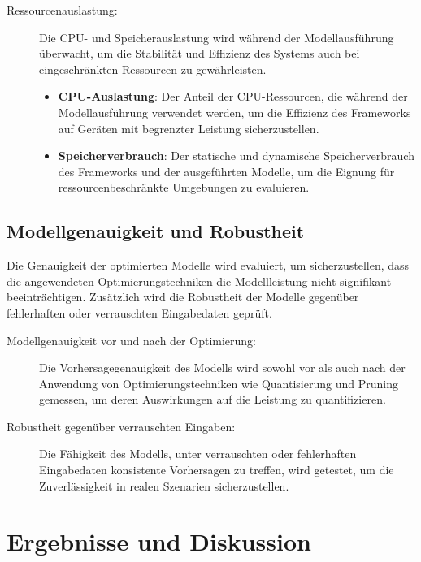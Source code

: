 \begin{description}
    \item[Ressourcenauslastung:] Die CPU- und Speicherauslastung wird während der Modellausführung überwacht, um die Stabilität und 
    Effizienz des Systems auch bei eingeschränkten Ressourcen zu gewährleisten.
    \begin{itemize}
        \item \textbf{CPU-Auslastung}: Der Anteil der CPU-Ressourcen, die während der Modellausführung verwendet werden, 
        um die Effizienz des Frameworks auf Geräten mit begrenzter Leistung sicherzustellen.
        \item \textbf{Speicherverbrauch}: Der statische und dynamische Speicherverbrauch des Frameworks und der ausgeführten Modelle, 
        um die Eignung für ressourcenbeschränkte Umgebungen zu evaluieren.
    \end{itemize}
\end{description}

\subsection{Modellgenauigkeit und Robustheit}

Die Genauigkeit der optimierten Modelle wird evaluiert, um sicherzustellen, dass die angewendeten Optimierungstechniken die Modellleistung 
nicht signifikant beeinträchtigen. Zusätzlich wird die Robustheit der Modelle gegenüber fehlerhaften oder verrauschten Eingabedaten geprüft. 

\begin{description}
    \item[Modellgenauigkeit vor und nach der Optimierung:] Die Vorhersagegenauigkeit des Modells wird sowohl vor als auch 
    nach der Anwendung von Optimierungstechniken wie Quantisierung und Pruning gemessen, um deren Auswirkungen auf die Leistung zu quantifizieren.
    \item[Robustheit gegenüber verrauschten Eingaben:] Die Fähigkeit des Modells, unter verrauschten oder fehlerhaften 
    Eingabedaten konsistente Vorhersagen zu treffen, wird getestet, um die Zuverlässigkeit in realen Szenarien sicherzustellen.
\end{description}

\section{Ergebnisse und Diskussion}

